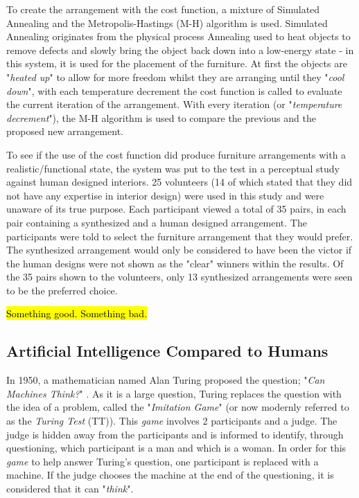 To create the arrangement with the cost function, a mixture of Simulated Annealing and the Metropolis-Hastings (M-H) algorithm is used. Simulated Annealing originates from the physical process Annealing used to heat objects to remove defects and slowly bring the object back down into a low-energy state \cite{simulated-annealing} - in this system, it is used for the placement of the furniture. At first the objects are "\textit{heated up}" to allow for more freedom whilst they are arranging until they "\textit{cool down}", with each temperature decrement the cost function is called to evaluate the current iteration of the arrangement. With every iteration (or "\textit{temperature decrement}"), the M-H algorithm \cite{understanding-mh-algorithm} is used to compare the previous and the proposed new arrangement.


To see if the use of the cost function did produce furniture arrangements with a realistic/functional state, the system was put to the test in a perceptual study against human designed interiors. 25 volunteers (14 of which stated that they did not have any expertise in interior design) were used in this study and were unaware of its true purpose. Each participant viewed a total of 35 pairs, in each pair containing a synthesized and a human designed arrangement. The participants were told to select the furniture arrangement that they would prefer. The synthesized arrangement would only be considered to have been the victor if the human designs were not shown as the "clear" winners within the results. Of the 35 pairs shown to the volunteers, only 13 synthesized arrangements were seen to be the preferred choice.

\hl{Something good. Something bad.}

\subsection{Artificial Intelligence Compared to Humans}
In 1950, a mathematician named Alan Turing proposed the question; "\textit{Can Machines Think?}" \cite{turing}. %
As it is a large question, Turing replaces the question with the idea of a problem, called the "\textit{Imitation Game}" (or now modernly referred to as the \textit{Turing Test} (TT)). This \textit{game} involves 2 participants and a judge. The judge is hidden away from the participants and is informed to identify, through questioning, which participant is a man and which is a woman. In order for this \textit{game} to help answer Turing's question, one participant is replaced with a machine. If the judge chooses the machine at the end of the questioning, it is considered that it can "\textit{think}".

